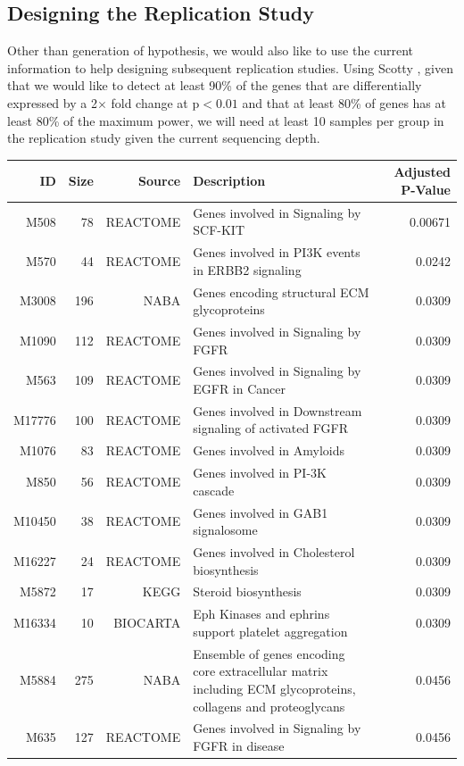 \subsection{Designing the Replication Study}
Other than generation of hypothesis, we would also like to use the current information to help designing subsequent replication studies.
Using Scotty \citep{Busby2013}, given that we would like to detect at least 90\% of the genes that are differentially expressed by a 2$\times$ fold change at p$<0.01$ and that at least 80\% of genes has at least 80\% of the maximum power, we will need at least 10 samples per group in the replication study given the current sequencing depth.

\begin{landscape}
	\begin{table}
		\begin{tabular}{rrrp{10cm}r}
			\toprule
			ID&	Size&	Source&	Description&	Adjusted P-Value\\
			\midrule
			M508&	78&	REACTOME&	Genes involved in Signaling by SCF-KIT&	0.00671\\
			M570&	44&	REACTOME&	Genes involved in PI3K events in ERBB2 signaling&	0.0242\\
			M3008&	196&	NABA&	Genes encoding structural ECM glycoproteins&	0.0309\\
			M1090&	112&	REACTOME&	Genes involved in Signaling by FGFR&	0.0309\\
			M563&	109&	REACTOME&	Genes involved in Signaling by EGFR in Cancer&	0.0309\\
			M17776&	100&	REACTOME&	Genes involved in Downstream signaling of activated FGFR&	0.0309\\
			M1076&	83&	REACTOME&	Genes involved in Amyloids&	0.0309\\
			M850&	56&	REACTOME&	Genes involved in PI-3K cascade&	0.0309\\
			M10450&	38&	REACTOME&	Genes involved in GAB1 signalosome&	0.0309\\
			M16227&	24&	REACTOME&	Genes involved in Cholesterol biosynthesis&	0.0309\\
			M5872&	17&	KEGG&	Steroid biosynthesis&	0.0309\\
			M16334&	10&	BIOCARTA&	Eph Kinases and ephrins support platelet aggregation&	0.0309\\
			M5884&	275&	NABA&	Ensemble of genes encoding core extracellular matrix including ECM glycoproteins, collagens and proteoglycans&	0.0456\\
			M635&	127&	REACTOME&	Genes involved in Signaling by FGFR in disease&	0.0456\\

\end{tabular}
\end{table}
\end{landscape}
